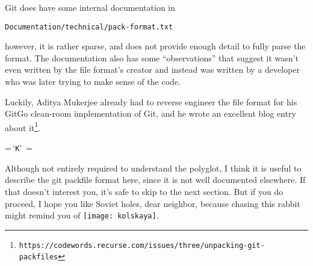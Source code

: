 \documentclass{article}
\begin{document}
Git does have some internal documentation in
\begin{center}
  \texttt{Documentation/technical/pack-format.txt}
\end{center}
however, it is rather sparse, and does not provide enough detail to
fully parse the format. The documentation also has some
``observations'' that suggest it wasn't even written by the file
format's creator and instead was written by a developer who was later
trying to make sense of the code.

Luckily, Aditya Mukerjee already had to reverse engineer the file
format for his GitGo clean-room implementation of Git, and he wrote an
excellent blog entry about
it\footnote{\texttt{https://codewords.recurse.com/issues/three/unpacking-git-packfiles}}.

\begin{center}
{\small
\def\char#1{\,`\texttt{#1}'\,}
=\hbox{\char{K}}
\newdimen\bytewidth\bytewidth=
\def\byte#1{\hbox to \bytewidth{\hfil\texttt{#1}\hfil}}
\def\desc#1#2{\hbox to #1\bytewidth{\hfil #2\hfil}}
\def\underbrace#1{\draw [
    thick,
    decoration={
        brace,
        mirror,
        raise=2pt
    },
    decorate
] ([xshift=1pt]#1.base west) -- ([xshift=-1pt]#1.base east) 
node (#1label) [pos=0.5,anchor=north,yshift=-2pt]}
}
\end{center}

Although not entirely required to understand the polyglot, I think it
is useful to describe the git packfile format here, since it is not
well documented elsewhere. If that doesn't interest you, it's safe to
skip to the next section.  But if you do proceed, I hope you like
Soviet holes, dear neighbor, because chasing this rabbit might remind
you of \texttt{[image: kolskaya]}.
\end{document}
